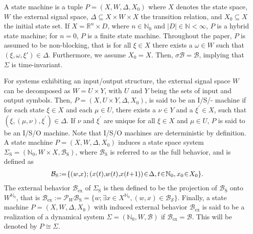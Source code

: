 \documentclass[a4paper, 10pt, conference]{ieeeconf}
\newcommand{\hspm}{\hspace{-2pt}}
\begin{document}
A state machine is a tuple $P=(X,W,\Delta,X_0)$ where $X$ denotes the state space, $W$ the external signal space, $\Delta\subseteq X\times W\times X$ the transition relation, and $X_0\subseteq X$ the initial state set. If $X=\mathbb{R}^n\times D$, where $n\in\mathbb{N}_0$ and $|D|\in\mathbb{N}<\infty$, $P$ is a hybrid state machine; for $n=0$, $P$ is a finite state machine. Throughout the paper, $P$ is assumed to be non-blocking, that is for all $\xi\in X$ there exists a $\omega\in W$ such that $(\xi,\omega,\xi')\in \Delta$. Furthermore, we assume $X_0=X$. Then, $\sigma\mathcal{B}=\mathcal{B}$, implying that $\Sigma$ is time-invariant.

For systems exhibiting an input/output structure,  the external signal space $W$ can be decomposed as $W=U\times Y$, with $U$ and $Y$ being the sets of input and output symbols. Then, $P=(X,U\times Y,\Delta,X_0)$, is said to be an {I/S/- machine} if for each state $\xi\in X$ and each $\mu\in U$, there exists a $\nu\in Y$ and a $\xi^\prime\in X$, such that $(\xi,(\mu,\nu),\xi^\prime)\in\Delta$. If $\nu$ and $\xi^\prime$ are unique for all $\xi\in X$ and $\mu\in U$, $P$ is said to be an {I/S/O machine}. Note that I/S/O machines are deterministic by definition. A state machine $P=(X,W,\Delta,X_0)$ induces a state space system $\Sigma_\text{S}=(\mathbb{N}_0,W\times X,\mathcal{B}_\text{S})$, where $\mathcal{B}_\text{S}$ is referred to as the {full behavior}, and is defined as
\begin{align}
\mathcal{B}_\text{S}\hspm:=\hspm\{(w,\hspm x); (x(t),\hspm w(t),\hspm x({t\hspm+\hspm1}))\hspm\in\hspm \Delta, t\hspm\in\hspm \mathbb{N}_0,x_0\hspm\in\hspm X_0\}.
\end{align}
The external behavior $\mathcal{B}_{\text{ex}}$ of $\Sigma_\text{S}$ is then defined to be the projection of $\mathcal{B}_\text{S}$ onto $W^{\mathbb{N}_0}$, that is $\mathcal{B}_{\text{ex}}:=\mathcal{P}_W\mathcal{B}_\text{S}=\{w; \exists x\in X^{\mathbb{N}_0}, (w,x) \in \mathcal{B_\text{S}}\}$. Finally, a state machine $P=(X,W,\Delta,X_0)$ with induced external behavior $\mathcal{B}_{\text{ex}}$ is said to be a realization of a dynamical system $\Sigma=(\mathbb{N}_0,W,\mathcal{B})$ if $\mathcal{B}_{\text{ex}} = \mathcal{B}$. This will be denoted by  $P \cong \Sigma$.
\end{document}
